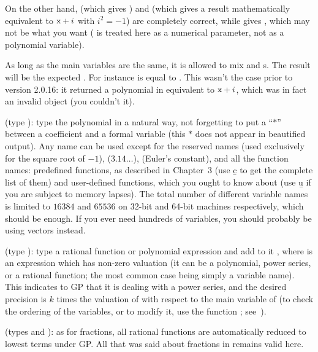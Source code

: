On the other hand, 
(which gives ) and 
(which gives a result mathematically equivalent to ${\tt x} + i$ with
$i^2=-1$) are completely correct, while 
gives , which may not be what you want (
is treated here as a numerical parameter, not as a polynomial variable).

 As long as the main variables
are the same, it is allowed to mix  and s. The result
will be the expected . For instance  is equal to . This wasn't the case prior to
version 2.0.16: it returned a polynomial in  equivalent to ${\tt x}
+ i$, which was in fact an invalid object (you couldn't  it).

\label{se:pol}
(type ): type the polynomial in a natural way, not
forgetting to put a ``$*$'' between a coefficient and a formal variable
(this $*$ does not appear in beautified output). Any  name
can be used except for the reserved names  (used exclusively for the
square root of $-1$),  ($3.14\dots$),  (Euler's
constant), and all the function names: predefined functions, as described
in Chapter~3 (use \b{c} to get the complete list of them) and user-defined
functions, which you ought to know about (use \b{u} if you are subject to
memory lapses). The total number of different variable names is limited to
$16384$ and $65536$ on 32-bit and 64-bit machines respectively, which
should be enough. If you ever need hundreds of variables, you should
probably be using vectors instead.

\label{se:series}
(type ): type a rational function or
polynomial expression and add to it \hbox{},
where  is an expression which has non-zero valuation (it can be a
polynomial, power series, or a rational function; the most common case being
simply a variable name).
This indicates to GP that it is dealing with a power series, and the desired
precision is $k$ times the valuation of  with respect to the
main variable of  (to check the ordering of the variables, or
to modify it, use the function ; see~).

(types  and ): as for fractions, all rational
functions are automatically reduced to lowest terms under GP. All that was
said about fractions in  remains valid here.

